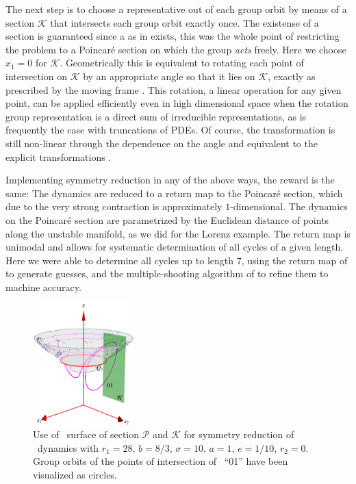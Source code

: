 The next step is to choose a representative out of each group orbit by means of a section $\mathcal{K}$ that intersects each group orbit
exactly once. The existense of a section is guaranteed since a {\csection} as in  exists,
this was the whole point of restricting the problem to a Poincar\'e section
on which the group \emph{acts} freely. Here we choose $x_1=0$ for $\mathcal{K}$. Geometrically
this is equivalent to rotating each point of intersection on $\mathcal{K}$ by
an appropriate angle so that it lies on $\mathcal{K}$, exactly as prescribed by
the moving frame . This rotation, a linear operation for any given point,
can be applied efficiently even in high dimensional space when the rotation group representation is a direct
sum of irreducible representations, as is frequently the case with truncations of PDEs.
Of course, the transformation is still non-linear through the dependence on the angle and equivalent
to the explicit transformations .

Implementing symmetry reduction in any of the above ways, the reward is the same: The
dynamics are reduced to a return map to the Poincar\'e section, which due to
the very strong contraction is approximately $1$-dimensional. The dynamics on the Poincar\'e
section are parametrized by the Euclidean distance of points along the unstable manifold, as we did
for the Lorenz example.
The return map is unimodal and allows for systematic determination of all cycles of
a given length. Here we were able to determine all cycles up to length $7$, using
the return map of  to generate guesses, and the multiple-shooting
algorithm of  to refine them to machine accuracy.

\begin{figure}[ht]
\begin{center}
  \includegraphics[width=0.35\textwidth]{../figs/CLEmartini}
\end{center}
\caption[\CLe\ desymmetrization with double section]{Use of \Poincare\
surface of section $\mathcal{P}$ and {\csection} $\mathcal{K}$ for symmetry
reduction of \CLe\ dynamics with $r_1=28,\, b=8/3,\, \sigma=10,\, a=1$, $e=1/10$, $r_2=0$.
Group orbits of the points of intersection of \rpo\ ``01'' have been visualized as circles.
    }
\label{fig:CLEmartini}
\end{figure}


